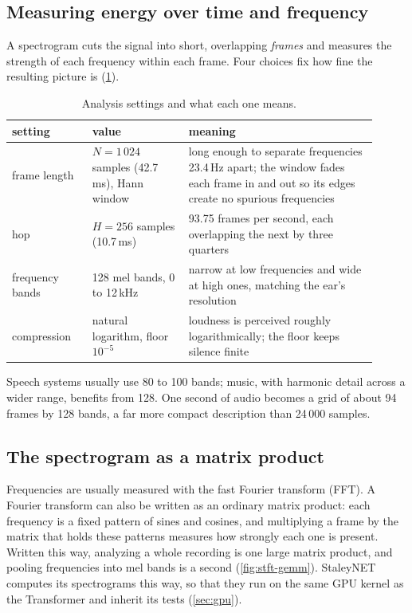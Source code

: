 \subsection{Measuring energy over time and frequency}

A spectrogram cuts the signal into short, overlapping \emph{frames} and
measures the strength of each frequency within each frame. Four choices fix
how fine the resulting picture is (\cref{tab:analysis}).

\begin{table}[htbp]
\centering
\caption{Analysis settings and what each one means.}
\label{tab:analysis}
\footnotesize
\setlength{\tabcolsep}{4pt}
\begin{tabular}{@{}p{0.2\linewidth}p{0.24\linewidth}p{0.47\linewidth}@{}}
\toprule
setting & value & meaning \\
\midrule
frame length & $N = 1\,024$ samples (42.7\,ms), Hann window & long enough to separate frequencies 23.4\,Hz apart; the window fades each frame in and out so its edges create no spurious frequencies \\
hop & $H = 256$ samples (10.7\,ms) & 93.75 frames per second, each overlapping the next by three quarters \\
frequency bands & 128 mel bands, 0 to 12\,kHz & narrow at low frequencies and wide at high ones, matching the ear's resolution \cite{slaney1998auditory} \\
compression & natural logarithm, floor $10^{-5}$ & loudness is perceived roughly logarithmically; the floor keeps silence finite \\
\bottomrule
\end{tabular}
\end{table}

Speech systems usually use 80 to 100 bands; music, with harmonic detail across
a wider range, benefits from 128. One second of audio becomes a grid of about
94 frames by 128 bands, a far more compact description than 24\,000 samples.

\subsection{The spectrogram as a matrix product}

Frequencies are usually measured with the fast Fourier transform (FFT). A
Fourier transform can also be written as an ordinary matrix product: each
frequency is a fixed pattern of sines and cosines, and multiplying a frame by
the matrix that holds these patterns measures how strongly each one is
present. Written this way, analyzing a whole recording is one large matrix
product, and pooling frequencies into mel bands is a second
(\cref{fig:stft-gemm}). StaleyNET computes its spectrograms this way, so that
they run on the same GPU kernel as the Transformer and inherit its tests
(\cref{sec:gpu}).

